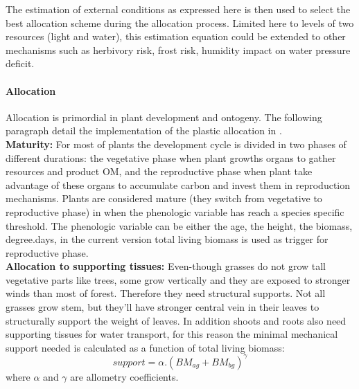 \indent The estimation of external conditions as expressed here is then used to select the best allocation scheme during the allocation process. Limited here to levels of two resources (light and water), this estimation equation could be extended to other mechanisms such as herbivory risk, frost risk, humidity impact on water pressure deficit.\\

\paragraph{Allocation} \label{par:allocation}
Allocation is primordial in plant development and ontogeny. The following paragraph detail the implementation of the plastic allocation in \model.\\

\textbf{Maturity:} For most of plants the development cycle is divided in two phases of different durations: the vegetative phase when plant growths organs to gather resources and product OM, and the reproductive phase when plant take advantage of these organs to accumulate carbon and invest them in reproduction mechanisms. Plants are considered mature (they switch from vegetative to reproductive phase) in \model when the phenologic variable has reach a species specific threshold. The phenologic variable can be either the age, the height, the biomass, degree.days, in the current version total living biomass is used as trigger for reproductive phase.\\

\textbf{Allocation to supporting tissues:} Even-though grasses do not grow tall vegetative parts like trees, some grow vertically and they are exposed to stronger winds than most of forest. Therefore they need structural supports. Not all grasses grow stem, but they'll have stronger central vein in their leaves to structurally support the weight of leaves. In addition shoots and roots also need supporting tissues for water transport, for this reason the minimal mechanical support needed is calculated as a function of total living biomass:
\begin{equation}
support = \alpha . (BM_{ag} + BM_{bg})^\gamma
\end{equation}
where $\alpha$ and $\gamma$ are allometry coefficients.\\

